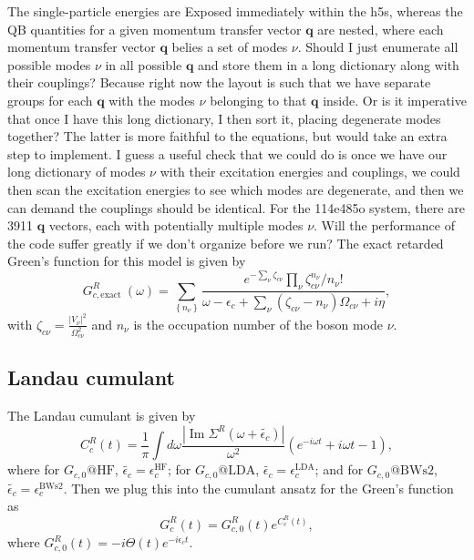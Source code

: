 The single-particle energies are Exposed immediately within the h5s, whereas the QB quantities for a given momentum transfer vector $\mathbf{q}$ are nested, where each momentum transfer vector $\bm{q}$ belies a set of modes $\nu$. Should I just enumerate all possible modes $\nu$ in all possible $\bm{q}$ and store them in a long dictionary along with their couplings? Because right now the layout is such that we have separate groups for each $\bm{q}$ with the modes $\nu$ belonging to that $\bm{q}$ inside. Or is it imperative that once I have this long dictionary, I then sort it, placing degenerate modes together? The latter is more faithful to the equations, but would take an extra step to implement. I guess a useful check that we could do is once we have our long dictionary of modes $\nu$ with their excitation energies and couplings, we could then scan the excitation energies to see which modes are degenerate, and then we can demand the couplings should be identical.  For the 114e485o system, there are 3911 $\bm{q}$ vectors, each with potentially multiple modes $\nu$. Will the performance of the code suffer greatly if we don't organize before we run? The exact retarded Green's function for this model is given by
\begin{equation}
    G^R_{c,\text {exact }}(\omega)=\sum_{\left\{n_\nu\right\}} \frac{e^{-\sum_\nu \zeta_{c\nu}} \prod_\nu \zeta_{c\nu}^{n_\nu} / n_{\nu}!}{\omega-\epsilon_c+\sum_\nu (\zeta_{c\nu}-n_\nu )\Omega_{c\nu}+i \eta}, 
\label{eq:exact_g}
\end{equation}
with  $\zeta_{c\nu} = \frac{|V_\nu|^2}{\Omega_{c\nu}^2}$ and $n_\nu$ is the occupation number of the boson mode $\nu$.
\subsection{Landau cumulant}
The Landau cumulant is given by
\begin{equation}
    C_c^R(t) = \frac{1}{\pi}\int d\omega \frac{|\operatorname{Im} \Sigma^R(\omega+\tilde{\epsilon_c})|}{\omega^2} \left( e^{-i\omega t} + i\omega t - 1 \right),
\end{equation}
where for $G_{c,0}@\mathrm{HF}$, $\tilde{\epsilon_c} = \epsilon_c^{\mathrm{HF}}$; for $G_{c,0}@\mathrm{LDA}$, $\tilde{\epsilon_c} = \epsilon_c^{\mathrm{LDA}}$; and for $G_{c,0}@\mathrm{BWs2}$, $\tilde{\epsilon_c} = \epsilon_c^{\mathrm{BWs2}}$. Then we plug this into the cumulant ansatz for the Green's function as 
\begin{equation}
    G^R_c(t) = G_{c,0}^R(t) e^{C_c^R(t)},
\end{equation}
where $G_{c,0}^R(t) = -i \Theta(t) e^{-i\epsilon_c t}$.
